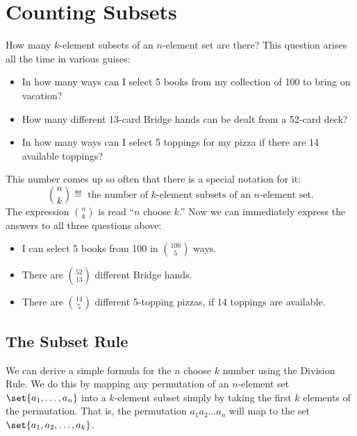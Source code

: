 \begin{problems}
\homeworkproblems
{}
\end{problems}

\section{Counting Subsets}\label{combinations_sec}

How many $k$-element subsets of an $n$-element set are there?  This
question arises all the time in various guises:

\begin{itemize}

\item In how many ways can I select 5 books from my collection of 100
to bring on vacation?

\item How many different 13-card Bridge hands can be dealt from a
52-card deck?

\item In how many ways can I select 5 toppings for my pizza if there
are 14 available toppings?

\end{itemize}

This number comes up so often that there is a special notation for it:
\[
\binom{n}{k} \eqdef \text{ the number of $k$-element subsets of an $n$-element set.}
\]
The expression $\binom{n}{k}$ is read ``$n$ choose $k$.''  Now we can
immediately express the answers to all three questions above:

\begin{itemize}

\item I can select 5 books from 100 in $\binom{100}{5}$ ways.

\item There are $\binom{52}{13}$ different Bridge hands.

\item There are $\binom{14}{5}$ different 5-topping pizzas, if 14
toppings are available.

\end{itemize}

\subsection{The Subset Rule}

We can derive a simple formula for the $n$ choose $k$ number using the
Division Rule.  We do this by mapping any permutation of an $n$-element
set $\set{a_1,\dots, a_n}$ into a $k$-element subset simply by taking the
first $k$ elements of the permutation.  That is, the permutation
$a_1a_2\dots a_n$ will map to the set $\set{a_1,a_2,\dots,a_k}$.

